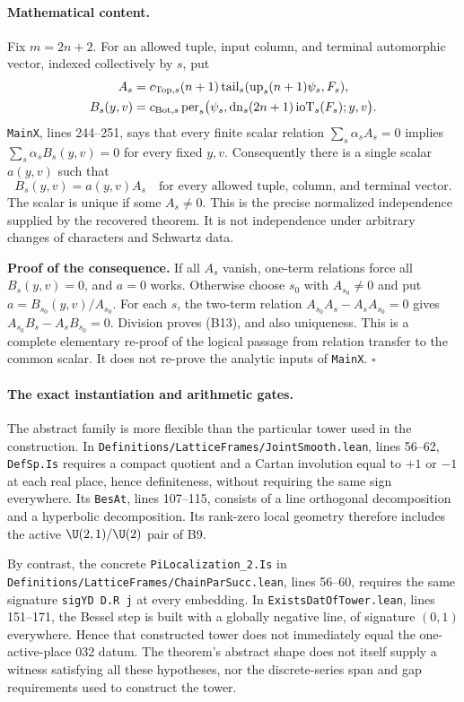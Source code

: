 \paragraph{Mathematical content.}
Fix $m=2n+2$. For an allowed tuple, input column, and terminal automorphic vector, indexed collectively by $s$, put
\begin{align*}
 A_s&=c_{{\rm Top},s}(n+1)
      \operatorname{tail}_s(\operatorname{up}_s(n+1)\psi_s,F_s),\\
 B_s(y,v)&=c_{{\rm Bot},s}
      \operatorname{per}_s\bigl(\psi_s,
       \operatorname{dn}_s(2n+1)\operatorname{ioT}_s(F_s);y,v\bigr).
\end{align*}
\texttt{MainX}, lines 244--251, says that every finite scalar relation
$\sum_s\alpha_s A_s=0$ implies
$\sum_s\alpha_s B_s(y,v)=0$ for every fixed $y,v$.
Consequently there is a single scalar $a(y,v)$ such that
\[
 B_s(y,v)=a(y,v)A_s
 \quad\text{for every allowed tuple, column, and terminal vector.}
 \tag{B13}
\]
The scalar is unique if some $A_s\ne0$. This is the precise normalized independence supplied by the recovered theorem. It is not independence under arbitrary changes of characters and Schwartz data.

\textbf{Proof of the consequence.} If all $A_s$ vanish, one-term relations force all $B_s(y,v)=0$, and $a=0$ works. Otherwise choose $s_0$ with $A_{s_0}\ne0$ and put $a=B_{s_0}(y,v)/A_{s_0}$. For each $s$, the two-term relation
$A_{s_0}A_s-A_sA_{s_0}=0$ gives
$A_{s_0}B_s-A_sB_{s_0}=0$. Division proves (B13), and also uniqueness. This is a complete elementary re-proof of the logical passage from relation transfer to the common scalar. It does not re-prove the analytic inputs of \texttt{MainX}. \hfill$\square$

\paragraph{The exact instantiation and arithmetic gates.}
The abstract family is more flexible than the particular tower used in the construction. In \texttt{Definitions/LatticeFrames/JointSmooth.lean}, lines 56--62, \texttt{DefSp.Is} requires a compact quotient and a Cartan involution equal to $+1$ or $-1$ at each real place, hence definiteness, without requiring the same sign everywhere. Its \texttt{BesAt}, lines 107--115, consists of a line orthogonal decomposition and a hyperbolic decomposition. Its rank-zero local geometry therefore includes the active $\U(2,1)/\U(2)$ pair of B9.

By contrast, the concrete \texttt{PiLocalization\_2.Is} in
\texttt{Definitions/LatticeFrames/ChainParSucc.lean}, lines 56--60, requires the same signature \texttt{sigYD D.R j} at every embedding. In \texttt{ExistsDatOfTower.lean}, lines 151--171, the Bessel step is built with a globally negative line, of signature $(0,1)$ everywhere. Hence that constructed tower does not immediately equal the one-active-place 032 datum. The theorem's abstract shape does not itself supply a witness satisfying all these hypotheses, nor the discrete-series span and gap requirements used to construct the tower.

